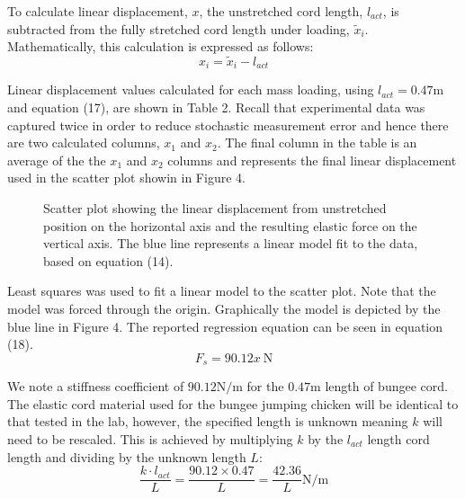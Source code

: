 \documentclass[a4paper]{article}
\begin{document}
To calculate linear displacement, $x$, the unstretched cord length, $l_{act}$, is subtracted from the fully stretched cord length under loading, $\tilde{x}_i$. Mathematically, this calculation is expressed as follows:
\begin{equation}
x_i = \tilde{x}_i - l_{act}
\end{equation}

Linear displacement values calculated for each mass loading, using $l_{act} = 0.47\si{\meter}$ and equation (17), are shown in Table 2. Recall that experimental data was captured twice in order to reduce stochastic measurement error and hence there are two calculated columns, $x_1$ and $x_2$. The final column in the table is an average of the the $x_1$ and $x_2$ columns and represents the final linear displacement used in the scatter plot showin in Figure 4. 

\begin{figure}[h]
	\centering
	\caption{Scatter plot showing the linear displacement from unstretched position on the horizontal axis and the resulting elastic force on the vertical axis. The blue line represents a linear model fit to the data, based on equation (14).}
\end{figure}

Least squares was used to fit a linear model to the scatter plot. Note that the model was forced through the origin. Graphically the model is depicted by the blue line in Figure 4. The reported regression equation can be seen in equation (18).
\begin{equation}
F_s = 90.12x \ \si{\newton}
\end{equation}

We note a stiffness coefficient of $90.12\si{\newton\per\meter}$ for the $0.47\si{\meter}$ length of bungee cord. The elastic cord material used for the bungee jumping chicken will be identical to that tested in the lab, however, the specified length is unknown meaning $k$ will need to be rescaled. This is achieved by multiplying $k$ by the $l_{act}$ length cord length and dividing by the unknown length $L$:
\begin{equation}
\frac{k \cdot l_{act}}{L} = \frac{90.12 \times 0.47}{L} = \frac{42.36}{L} \si{\newton\per\meter}
\end{equation}
\end{document}
